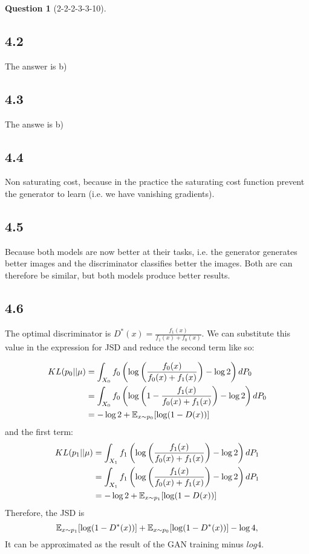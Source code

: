 \documentclass[12pt]{article}
\theoremstyle{definition}
\newtheorem{exercise}{Question}%
\begin{document}
\begin{exercise}[2-2-2-3-3-10]
{  \subsection*{4.2}
  The answer is b)
  \subsection*{4.3}
  The answe is b)
  \subsection*{4.4}
  Non saturating cost, because in the practice the saturating cost function
  prevent the generator to learn (i.e. we have vanishing gradients).
  \subsection*{4.5}
  Because both models are now better at their tasks, i.e. the generator
  generates better images and the discriminator classifies better the images.
  Both are can therefore be similar, but both models produce better results.
  \subsection*{4.6}
  The optimal discriminator is $D^*(x) = \frac{f_{1}(x)}{f_{1}(x) + f_{0}(x)}$.
  We can substitute this value in the expression for JSD and reduce the second term like so:

  \begin{align*}
    KL(p_{0}||\mu) &= \int_{X_{0}} f_{0} \left( \log \left( \frac{f_{0}(x)}{f_{0}(x)+f_{1}(x)} \right) -\log 2  \right) dP_{0}\\
                &= \int_{X_{0}} f_{0} \left( \log \left( 1 - \frac{f_{1}(x)}{f_{0}(x)+f_{1}(x)} \right) -\log 2  \right) dP_{0}\\
                &= - \log 2 + \mathbb{E}_{x \sim p_{0}}{\left[ \log(1-D(x)) \right]}
  \end{align*} and the first term:
  \begin{align*}
    KL(p_{1}||\mu) &= \int_{X_{1}} f_{1} \left( \log \left( \frac{f_{1}(x)}{f_{0}(x)+f_{1}(x)} \right) -\log 2  \right) dP_{1}\\
                &= \int_{X_{1}} f_{1} \left( \log \left( \frac{f_{1}(x)}{f_{0}(x)+f_{1}(x)} \right) -\log 2  \right) dP_{1}\\
                &= - \log 2 + \mathbb{E}_{x \sim p_{1}}{\left[ \log(1-D(x)) \right]}
  \end{align*} Therefore, the JSD is
  \begin{equation*}
      \mathbb{E}_{x \sim p_{1}}{\left[ \log(1-D^{*}(x)) \right]} + \mathbb{E}_{x \sim p_{0}}{\left[ \log(1-D^{*}(x)) \right]} - \log 4,
  \end{equation*} It can be approximated as the result of the GAN training minus $log 4$.
}
\end{exercise}
\end{document}
